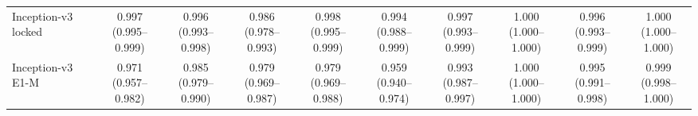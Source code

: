 \begin{tabular}{@{}lccccccccc@{}}
Inception-v3 locked & \makecell{0.997\\{\scriptsize (0.995--0.999)}} & \makecell{0.996\\{\scriptsize (0.993--0.998)}} & \makecell{0.986\\{\scriptsize (0.978--0.993)}} & \makecell{0.998\\{\scriptsize (0.995--0.999)}} & \makecell{0.994\\{\scriptsize (0.988--0.999)}} & \makecell{0.997\\{\scriptsize (0.993--0.999)}} & \makecell{1.000\\{\scriptsize (1.000--1.000)}} & \makecell{0.996\\{\scriptsize (0.993--0.999)}} & \makecell{1.000\\{\scriptsize (1.000--1.000)}} \\
Inception-v3 E1-M & \makecell{0.971\\{\scriptsize (0.957--0.982)}} & \makecell{0.985\\{\scriptsize (0.979--0.990)}} & \makecell{0.979\\{\scriptsize (0.969--0.987)}} & \makecell{0.979\\{\scriptsize (0.969--0.988)}} & \makecell{0.959\\{\scriptsize (0.940--0.974)}} & \makecell{0.993\\{\scriptsize (0.987--0.997)}} & \makecell{1.000\\{\scriptsize (1.000--1.000)}} & \makecell{0.995\\{\scriptsize (0.991--0.998)}} & \makecell{0.999\\{\scriptsize (0.998--1.000)}} \\
\bottomrule
\end{tabular}
